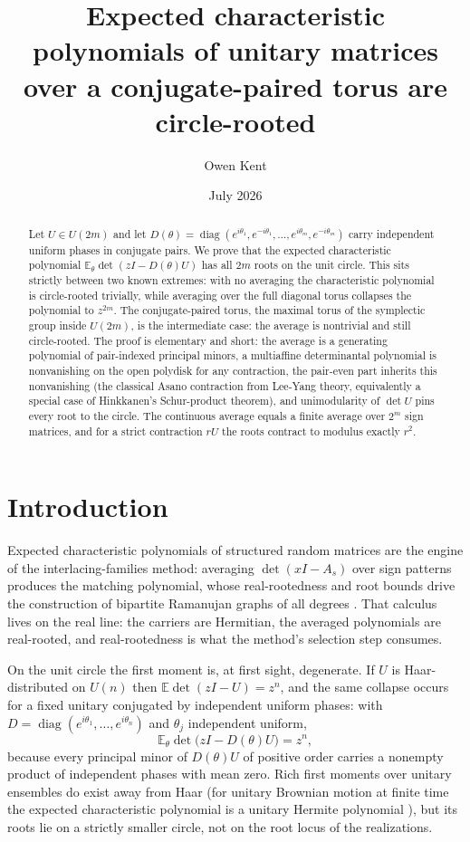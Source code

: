 \documentclass[11pt]{amsart}
\title{Expected characteristic polynomials of unitary matrices\\ over a conjugate-paired torus are circle-rooted}
\author{Owen Kent}
\date{July 2026}
\theoremstyle{definition}
\theoremstyle{remark}
\newcommand{\E}{\mathbb{E}}
\DeclareMathOperator{\diag}{diag}
\begin{document}
\begin{abstract}
Let $U \in U(2m)$ and let $D(\theta) = \diag(e^{i\theta_1}, e^{-i\theta_1}, \ldots, e^{i\theta_m}, e^{-i\theta_m})$ carry independent uniform phases in conjugate pairs. We prove that the expected characteristic polynomial $\E_\theta \det(zI - D(\theta)U)$ has all $2m$ roots on the unit circle. This sits strictly between two known extremes: with no averaging the characteristic polynomial is circle-rooted trivially, while averaging over the full diagonal torus collapses the polynomial to $z^{2m}$. The conjugate-paired torus, the maximal torus of the symplectic group inside $U(2m)$, is the intermediate case: the average is nontrivial and still circle-rooted. The proof is elementary and short: the average is a generating polynomial of pair-indexed principal minors, a multiaffine determinantal polynomial is nonvanishing on the open polydisk for any contraction, the pair-even part inherits this nonvanishing (the classical Asano contraction from Lee-Yang theory, equivalently a special case of Hinkkanen's Schur-product theorem), and unimodularity of $\det U$ pins every root to the circle. The continuous average equals a finite average over $2^m$ sign matrices, and for a strict contraction $rU$ the roots contract to modulus exactly $r^2$.
\end{abstract}

\maketitle

\section{Introduction}

Expected characteristic polynomials of structured random matrices are the engine of the interlacing-families method: averaging $\det(xI - A_s)$ over sign patterns produces the matching polynomial, whose real-rootedness and root bounds drive the construction of bipartite Ramanujan graphs of all degrees \cite{MSS15, HPS18}. That calculus lives on the real line: the carriers are Hermitian, the averaged polynomials are real-rooted, and real-rootedness is what the method's selection step consumes.

On the unit circle the first moment is, at first sight, degenerate. If $U$ is Haar-distributed on $U(n)$ then $\E \det(zI - U) = z^n$, and the same collapse occurs for a fixed unitary conjugated by independent uniform phases: with $D = \diag(e^{i\theta_1}, \ldots, e^{i\theta_n})$ and $\theta_j$ independent uniform,
\begin{equation}\label{eq:collapse}
\E_\theta \det\bigl(zI - D(\theta)U\bigr) = z^n ,
\end{equation}
because every principal minor of $D(\theta)U$ of positive order carries a nonempty product of independent phases with mean zero. Rich first moments over unitary ensembles do exist away from Haar (for unitary Brownian motion at finite time the expected characteristic polynomial is a unitary Hermite polynomial \cite{Kab25}), but its roots lie on a strictly smaller circle, not on the root locus of the realizations.
\end{document}

